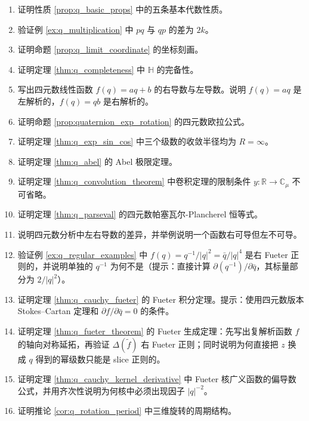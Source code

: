 \begin{enumerate}[leftmargin=3em, label=\textbf{题 \arabic*}]
    \item 证明性质 \ref{prop:q_basic_props} 中的五条基本代数性质。
    \item 验证例 \ref{ex:q_multiplication} 中 $pq$ 与 $qp$ 的差为 $2k$。
    \item 证明命题 \ref{prop:q_limit_coordinate} 的坐标刻画。
    \item 证明定理 \ref{thm:q_completeness} 中 $\mathbb{H}$ 的完备性。
    \item 写出四元数线性函数 $f(q)=aq+b$ 的右导数与左导数。说明 $f(q)=aq$ 是左解析的，$f(q)=qb$ 是右解析的。
    \item 证明命题 \ref{prop:quaternion_exp_rotation} 的四元数欧拉公式。
    \item 证明定理 \ref{thm:q_exp_sin_cos} 中三个级数的收敛半径均为 $R=\infty$。
    \item 证明定理 \ref{thm:q_abel} 的 Abel 极限定理。
    \item 证明定理 \ref{thm:q_convolution_theorem} 中卷积定理的限制条件 $y:\mathbb{R}\to\mathbb{C}_\mu$ 不可省略。
    \item 证明定理 \ref{thm:q_parseval} 的四元数帕塞瓦尔-Plancherel 恒等式。
    \item 说明四元数分析中左右导数的差异，并举例说明一个函数右可导但左不可导。
    \item 验证例 \ref{ex:q_regular_examples} 中 $f(q)=q^{-1}/|q|^2=\bar q/|q|^4$ 是右 Fueter 正则的，并说明单独的 $q^{-1}$ 为何不是（提示：直接计算 $\partial(q^{-1})/\partial\bar q$，其标量部分为 $2/|q|^2$）。
    \item 证明定理 \ref{thm:q_cauchy_fueter} 的 Fueter 积分定理。提示：使用四元数版本 Stokes--Cartan 定理和 $\partial f/\partial \bar q=0$ 的条件。
    \item 证明定理 \ref{thm:q_fueter_theorem} 的 Fueter 生成定理：先写出复解析函数 $f$ 的轴向对称延拓，再验证 $\Delta(\tilde f)$ 右 Fueter 正则；同时说明为何直接把 $z$ 换成 $q$ 得到的幂级数只能是 slice 正则的。
    \item 证明定理 \ref{thm:q_cauchy_kernel_derivative} 中 Fueter 核广义函数的偏导数公式，并用齐次性说明为何核中必须出现因子 $|q|^{-2}$。
    \item 证明推论 \ref{cor:q_rotation_period} 中三维旋转的周期结构。
\end{enumerate}

